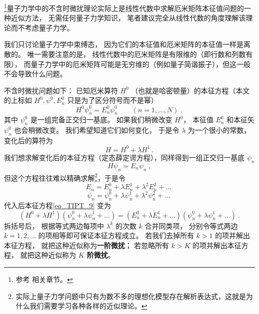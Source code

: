 

\footnote{参考 \cite{GriffQ} \cite{Shankar} \cite{Sakurai} \cite{Merzbacher} 相关章节。}量子力学中的不含时微扰理论实际上是线性代数中求解厄米矩阵本征值问题的一种近似方法， 无需任何量子力学知识， 笔者建议完全从线性代数的角度理解该理论而不考虑量子力学。

我们只讨论量子力学中束缚态， 因为它们的本征值和厄米矩阵的本征值一样是离散的。 唯一需要注意的是， 线性代数中的厄米矩阵是有限维的（即行数和列数有限）， 而量子力学中的厄米矩阵可能是无穷维的（例如量子简谐振子），但这一般不会导致什么问题。

不含时微扰问题如下： 已知厄米算符 $H^0$ （也就是哈密顿量）的本征方程（本文的上标如 $H^0, \psi^0, E_n^0$ 只是为了区分符号而不是幂）
\begin{equation}
H^0 \psi_n^0 = E_n^0 \psi_n^0 \qquad (n = 1,\dots, N)~,
\end{equation}
其中 $\psi_n^0$ 是一组完备正交归一基底。 如果我们稍微改变 $H^0$， 本征值 $E_n^0$ 和本征矢 $\psi_n^0$ 也会稍微改变。 我们希望知道它们如何变化， 于是令 $\lambda$ 为一个很小的常数， 变化后的算符为
\begin{equation}\label{eq_TIPT_3}
H = H^0 + \lambda H^1~.
\end{equation}
我们想求解变化后的本征方程（定态薛定谔方程），同样得到一组正交归一基底 $\psi_n$
\begin{equation}\label{eq_TIPT_9}
H \psi_n = E_n \psi_n~,
\end{equation}
但这个方程往往难以精确求解\footnote{实际上量子力学问题中只有为数不多的理想化模型存在解析表达式，这就是为什么我们需要学习各种各样的近似理论。}，于是令
\begin{equation}\label{eq_TIPT_11}
E_n = E_n^0 + \lambda E_n^1 + \lambda^2 E_n^2 + \dots~
\end{equation}
\begin{equation}\label{eq_TIPT_12}
\psi_n = \psi_n^0 + \lambda\psi_n^1 + \lambda^2 \psi_n^2 + \dots~
\end{equation}
代入后本征方程\autoref{eq_TIPT_9} 变为
\begin{equation}\label{eq_TIPT_10}
(H^0 + \lambda H^1)(\psi_n^0 + \lambda\psi_n^1 + \dots) = (E_n^0 + \lambda E_n^1 + \dots)(\psi_n^0 + \lambda\psi_n^1 + \dots)~.
\end{equation}
拆括号后， 根据等式两边每项中 $\lambda^k$ 的次数 $k$ 合并同类项， 分别令等式两边 $k=1,2,\dots$ 的项相等即可保证本征方程成立。 若我们去掉所有 $k > 1$ 的项并解出本征方程， 就把这种近似称为\textbf{一阶微扰}； 若忽略所有 $k > K$ 的项并解出本征方程， 就把这种近似称为 \textbf{$K$ 阶微扰}。


